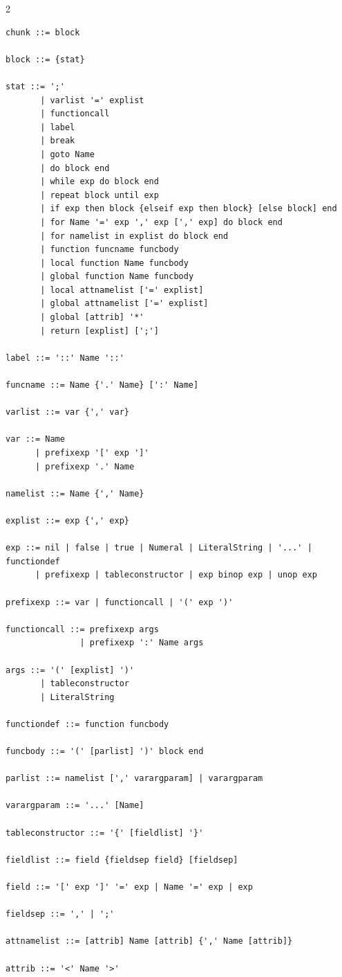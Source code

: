 \documentclass[10pt,letterpaper]{article}
\begin{document}
\begin{multicols}{2}
\begin{lstlisting}[style=grammarstyle]
chunk ::= block

block ::= {stat}

stat ::= ';'
       | varlist '=' explist
       | functioncall
       | label
       | break
       | goto Name
       | do block end
       | while exp do block end
       | repeat block until exp
       | if exp then block {elseif exp then block} [else block] end
       | for Name '=' exp ',' exp [',' exp] do block end
       | for namelist in explist do block end
       | function funcname funcbody
       | local function Name funcbody
       | global function Name funcbody
       | local attnamelist ['=' explist]
       | global attnamelist ['=' explist]
       | global [attrib] '*'
       | return [explist] [';']

label ::= '::' Name '::'

funcname ::= Name {'.' Name} [':' Name]

varlist ::= var {',' var}

var ::= Name
      | prefixexp '[' exp ']'
      | prefixexp '.' Name

namelist ::= Name {',' Name}

explist ::= exp {',' exp}

exp ::= nil | false | true | Numeral | LiteralString | '...' | functiondef
      | prefixexp | tableconstructor | exp binop exp | unop exp

prefixexp ::= var | functioncall | '(' exp ')'

functioncall ::= prefixexp args
               | prefixexp ':' Name args

args ::= '(' [explist] ')'
       | tableconstructor
       | LiteralString

functiondef ::= function funcbody

funcbody ::= '(' [parlist] ')' block end

parlist ::= namelist [',' varargparam] | varargparam

varargparam ::= '...' [Name]

tableconstructor ::= '{' [fieldlist] '}'

fieldlist ::= field {fieldsep field} [fieldsep]

field ::= '[' exp ']' '=' exp | Name '=' exp | exp

fieldsep ::= ',' | ';'

attnamelist ::= [attrib] Name [attrib] {',' Name [attrib]}

attrib ::= '<' Name '>'
\end{lstlisting}
\end{multicols}
\end{document}
